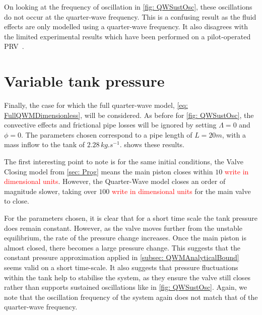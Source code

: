 On looking at the frequency of oscillation in \cref{fig: QWSustOsc}, these oscillations do not occur at the quarter-wave frequency. This is a confusing result as the fluid effects are only modelled using a quarter-wave frequency. It also disagrees with the limited experimental results which have been performed on a pilot-operated PRV~\cite{Allison2015TestingValves}.

\section{Variable tank pressure}

Finally, the case for which the full quarter-wave model, \cref{eq: FullQWMDimensionless}, will be considered. As before for \cref{fig: QWSustOsc}, the convective effects and frictional pipe losses will be ignored by setting $\Lambda = 0$ and $\phi = 0$. The parameters chosen correspond to a pipe length of $L = 20 \si{m}$, with a mass inflow to the tank of $2.28 \, \si{kg.s^{-1}}$.  shows these results.
~


The first interesting point to note is for the same initial conditions, the Valve Closing model from \cref{sec: Prog} means the main piston closes within $10$ \textcolor{Red}{write in dimensional units}. However, the Quarter-Wave model closes an order of magnitude slower, taking over $100$ \textcolor{Red}{write in dimensional units} for the main valve to close.

For the parameters chosen, it is clear that for a short time scale the tank pressure does remain constant. However, as the valve moves further from the unstable equilibrium, the rate of the pressure change increases. Once the main piston is almost closed, there becomes a large pressure change. This suggests that the constant pressure approximation applied in \cref{subsec: QWMAnalyticalBound} seems valid on a short time-scale. It also suggests that pressure fluctuations within the tank help to stabilise the system, as they ensure the valve still closes rather than supports sustained oscillations like in \cref{fig: QWSustOsc}. Again, we note that the oscillation frequency of the system again does not match that of the quarter-wave frequency.

